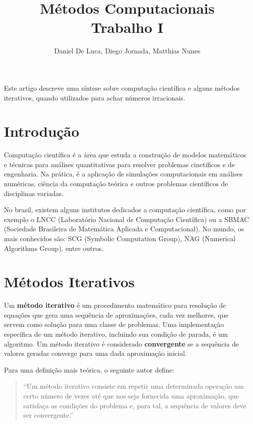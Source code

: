 \documentclass[a4paper]{article}
\author{Daniel De Luca, Diego Jornada, Matthias Nunes}
\title{Métodos Computacionais \\ Trabalho I}
\begin{document}
\maketitle

\begin{resumo}

Este artigo descreve uma síntese sobre computação científica e alguns métodos
iterativos, quando utilizados para achar números irracionais.

\end{resumo}

\section{Introdução}

Computação científica é a área que estuda a construção de modelos matemáticos e
técnicas para análises quantitativas para resolver problemas cinetíficos e de
engenharia. Na prática, é a aplicação de simulações computacionais em análises
numéricas, ciência da computação teórica e outros problemas científicos de
disciplinas variadas.

No brasil, existem alguns institutos dedicados a computação científica, como por
exemplo o LNCC (Laboratório Nacional de Computação Científica) ou a SBMAC
(Sociedade Brasileira de Matemática Aplicada e Computacional). No mundo, os mais
conhecidos são: SCG (Symbolic Computation Group), NAG (Numerical Algorithms
Group), entre outros.

\section{Métodos Iterativos}

Um \textbf{método iterativo} é um procedimento matemático para resolução de
equações que gera uma sequência de aproximações, cada vez melhores, que servem
como solução para uma classe de problemas. Uma implementação específica de um
método iterativo, incluindo sua condição de parada, é um algoritmo. Um método
iterativo é considerado \textbf{convergente} se a sequência de valores geradas
converge para uma dada aproximação inicial.

Para uma definição mais teórica, o seguinte autor define:

\begin{quotation}

``Um método iterativo consiste em repetir uma determinada operação um certo número
de vezes até que nos seja fornecida uma aproximação, que satisfaça as condições
do problema e, para tal, a sequência de valores deve ser
convergente.''\cite{batista2014metodos}

\end{quotation}
\end{document}
